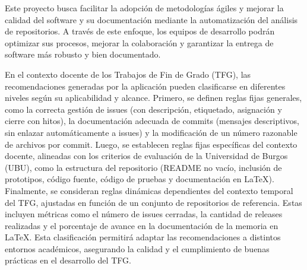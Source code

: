 Este proyecto busca facilitar la adopción de metodologías ágiles y mejorar la calidad del software y su documentación mediante la automatización del análisis de repositorios. A través de este enfoque, los equipos de desarrollo podrán optimizar sus procesos, mejorar la colaboración y garantizar la entrega de software más robusto y bien documentado.

En el contexto docente de los Trabajos de Fin de Grado (TFG), las recomendaciones generadas por la aplicación pueden clasificarse en diferentes niveles según su aplicabilidad y alcance. Primero, se definen reglas fijas generales, como la correcta gestión de issues (con descripción, etiquetado, asignación y cierre con hitos), la documentación adecuada de commits (mensajes descriptivos, sin enlazar automáticamente a issues) y la modificación de un número razonable de archivos por commit. Luego, se establecen reglas fijas específicas del contexto docente, alineadas con los criterios de evaluación de la Universidad de Burgos (UBU), como la estructura del repositorio (README no vacío, inclusión de prototipos, código fuente, código de pruebas y documentación en LaTeX). Finalmente, se consideran reglas dinámicas dependientes del contexto temporal del TFG, ajustadas en función de un conjunto de repositorios de referencia. Estas incluyen métricas como el número de issues cerradas, la cantidad de releases realizadas y el porcentaje de avance en la documentación de la memoria en LaTeX. Esta clasificación permitirá adaptar las recomendaciones a distintos entornos académicos, asegurando la calidad y el cumplimiento de buenas prácticas en el desarrollo del TFG.
